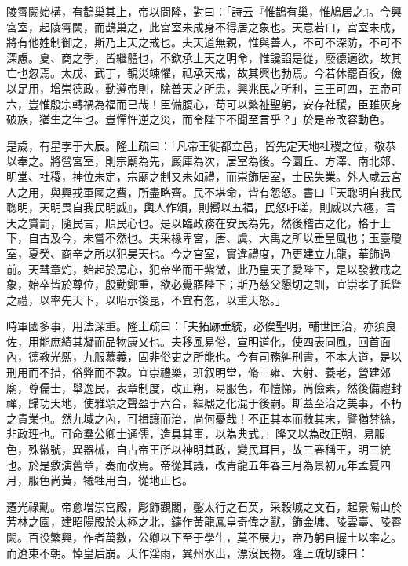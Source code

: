 \begin{pinyinscope}
 
 
 
 陵霄闕始構，有鵲巢其上，帝以問隆，對曰：「詩云『惟鵲有巢，惟鳩居之』。今興宮室，起陵霄闕，而鵲巢之，此宮室未成身不得居之象也。天意若曰，宮室未成，將有他姓制御之，斯乃上天之戒也。夫天道無親，惟與善人，不可不深防，不可不深慮。夏、商之季，皆繼體也，不欽承上天之明命，惟讒諂是從，廢德適欲，故其亡也忽焉。太戊、武丁，覩災竦懼，祗承天戒，故其興也勃焉。今若休罷百役，儉以足用，增崇德政，動遵帝則，除普天之所患，興兆民之所利，三王可四，五帝可六，豈惟殷宗轉禍為福而已哉！臣備腹心，苟可以繁祉聖躬，安存社稷，臣雖灰身破族，猶生之年也。豈憚忤逆之災，而令陛下不聞至言乎？」於是帝改容動色。
 
 
 
 
 是歲，有星孛于大辰。隆上疏曰：「凡帝王徙都立邑，皆先定天地社稷之位，敬恭以奉之。將營宮室，則宗廟為先，廄庫為次，居室為後。今圜丘、方澤、南北郊、明堂、社稷，神位未定，宗廟之制又未如禮，而崇飾居室，士民失業。外人咸云宮人之用，與興戎軍國之費，所盡略齊。民不堪命，皆有怨怒。書曰『天聦明自我民聦明，天明畏自我民明威』，輿人作頌，則嚮以五福，民怒吁嗟，則威以六極，言天之賞罰，隨民言，順民心也。是以臨政務在安民為先，然後稽古之化，格于上下，自古及今，未嘗不然也。夫采椽卑宮，唐、虞、大禹之所以垂皇風也；玉臺瓊室，夏癸、商辛之所以犯昊天也。今之宮室，實違禮度，乃更建立九龍，華飾過前。天彗章灼，始起於房心，犯帝坐而干紫微，此乃皇天子愛陛下，是以發教戒之象，始卒皆於尊位，殷勤鄭重，欲必覺寤陛下；斯乃慈父懇切之訓，宜崇孝子祗聳之禮，以率先天下，以昭示後昆，不宜有忽，以重天怒。」
 
 
 
 
 時軍國多事，用法深重。隆上疏曰：「夫拓跡垂統，必俟聖明，輔世匡治，亦須良佐，用能庶績其凝而品物康乂也。夫移風易俗，宣明道化，使四表同風，回首面內，德教光熈，九服慕義，固非俗吏之所能也。今有司務糾刑書，不本大道，是以刑用而不措，俗弊而不敦。宜崇禮樂，班叙明堂，脩三雍、大射、養老，營建郊廟，尊儒士，舉逸民，表章制度，改正朔，易服色，布愷悌，尚儉素，然後備禮封禪，歸功天地，使雅頌之聲盈于六合，緝熈之化混于後嗣。斯蓋至治之美事，不朽之貴業也。然九域之內，可揖讓而治，尚何憂哉！不正其本而救其末，譬猶棼絲，非政理也。可命羣公卿士通儒，造具其事，以為典式。」隆又以為改正朔，易服色，殊徽號，異器械，自古帝王所以神明其政，變民耳目，故三春稱王，明三統也。於是敷演舊章，奏而改焉。帝從其議，改青龍五年春三月為景初元年孟夏四月，服色尚黃，犧牲用白，從地正也。
 
 
 
 
 遷光祿勳。帝愈增崇宮殿，彫飾觀閣，鑿太行之石英，采穀城之文石，起景陽山於芳林之園，建昭陽殿於太極之北，鑄作黃龍鳳皇奇偉之獸，飾金墉、陵雲臺、陵霄闕。百役繁興，作者萬數，公卿以下至于學生，莫不展力，帝乃躬自握土以率之。而遼東不朝。悼皇后崩。天作淫雨，兾州水出，漂沒民物。隆上疏切諫曰：
 

\end{pinyinscope}
